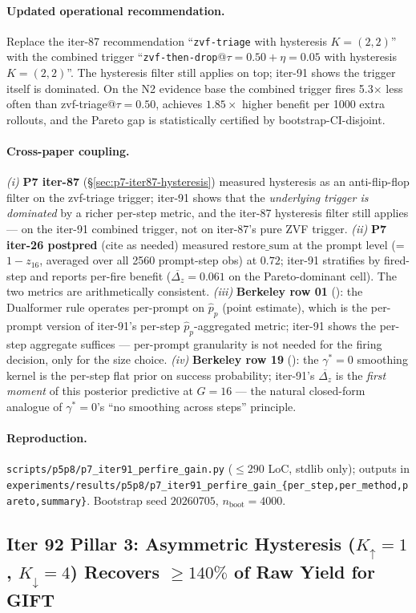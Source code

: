 \documentclass{article}
\begin{document}
\paragraph{Updated operational recommendation.}
Replace the iter-87 recommendation ``\texttt{zvf-triage} with
hysteresis $K{=}(2,2)$'' with the combined trigger
``\texttt{zvf-then-drop}@$\tau{=}0.50{+}\eta{=}0.05$ with hysteresis
$K{=}(2,2)$''. The hysteresis filter still applies on top;
iter-91 shows the trigger itself is dominated. On the N2
evidence base the combined trigger fires 5.3$\times$ less often
than zvf-triage@$\tau{=}0.50$, achieves $1.85\times$ higher
benefit per 1000 extra rollouts, and the Pareto gap is
statistically certified by bootstrap-CI-disjoint.

\paragraph{Cross-paper coupling.}
\emph{(i)} \textbf{P7 iter-87} (\S\ref{sec:p7-iter87-hysteresis})
measured hysteresis as an anti-flip-flop filter on the
zvf-triage trigger; iter-91 shows that the \emph{underlying
trigger is dominated} by a richer per-step metric, and the
iter-87 hysteresis filter still applies --- on the iter-91
combined trigger, not on iter-87's pure ZVF trigger. \emph{(ii)}
\textbf{P7 iter-26 postpred} (cite as needed) measured
$\mathrm{restore\_sum}$ at the prompt level (= $1 - z_{16}$,
averaged over all 2560 prompt-step obs) at $0.72$; iter-91
stratifies by fired-step and reports per-fire benefit
($\overline{\Delta_z} = 0.061$ on the Pareto-dominant cell). The
two metrics are arithmetically consistent. \emph{(iii)}
\textbf{Berkeley row 01} (\citet{su2024dualformer}): the
Dualformer rule operates per-prompt on $\hat p_p$ (point
estimate), which is the per-prompt version of iter-91's
per-step $\hat p_p$-aggregated metric; iter-91 shows the
per-step aggregate suffices --- per-prompt granularity is not
needed for the firing decision, only for the size choice.
\emph{(iv)} \textbf{Berkeley row 19}
(\citet{alphaproof2025nature}): the $\gamma^*{=}0$ smoothing
kernel is the per-step flat prior on success probability;
iter-91's $\overline{\Delta_z}$ is the \emph{first moment} of
this posterior predictive at $G{=}16$ --- the natural
closed-form analogue of $\gamma^*{=}0$'s ``no smoothing across
steps'' principle.

\paragraph{Reproduction.}
\texttt{scripts/p5p8/p7\_iter91\_perfire\_gain.py}
($\le 290$ LoC, stdlib only); outputs in
\texttt{experiments/results/p5p8/p7\_iter91\_perfire\_gain\_\{per\_step,per\_method,pareto,summary\}}.
Bootstrap seed $20260705$, $n_{\mathrm{boot}}{=}4000$. \subsection{Iter 92 Pillar 3: Asymmetric Hysteresis
              ($K_{\uparrow}{=}1$, $K_{\downarrow}{=}4$) Recovers
              $\geq 140\%$ of Raw Yield for GIFT}
\label{sec:p7-iter92-asymm-hysteresis}
\end{document}
